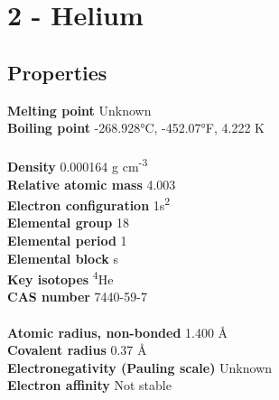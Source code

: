 \section{2 - Helium}
\label{sec:elem-helium}
\subsection{Properties}
\textbf{Melting point} Unknown\\
\textbf{Boiling point} -268.928°C, -452.07°F, 4.222 K\\
\\
\textbf{Density} 0.000164 g cm\textsuperscript{-3}\\
\textbf{Relative atomic mass} 4.003\\
\textbf{Electron configuration} 1s\textsuperscript{2}\\
\textbf{Elemental group} 18\\
\textbf{Elemental period} 1\\
\textbf{Elemental block} s\\
\textbf{Key isotopes} \textsuperscript{4}He\\
\textbf{CAS number} 7440-59-7\\
\\
\textbf{Atomic radius, non-bonded} 1.400 Å\\
\textbf{Covalent radius} 0.37 Å\\
\textbf{Electronegativity (Pauling scale)} Unknown\\
\textbf{Electron affinity} Not stable\\